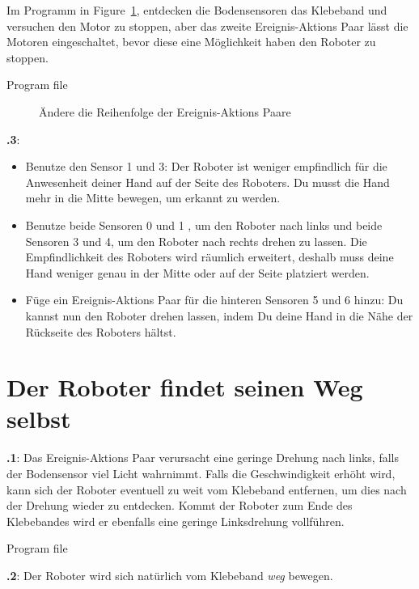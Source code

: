 \documentclass[12pt,a4paper,ngerman]{article}
\begin{document}
Im Programm in Figure~\ref{fig.change}, entdecken die Bodensensoren das Klebeband und versuchen den Motor zu stoppen, aber das zweite Ereignis-Aktions Paar lässt die Motoren eingeschaltet, bevor diese eine Möglichkeit haben den Roboter zu stoppen.

{\raggedleft \hfill Program file }

\begin{figure}[hbt]
\begin{center}
\caption{Ändere die Reihenfolge der Ereignis-Aktions Paare}
\label{fig.change}
\end{center}
\end{figure}

\textbf{\thesection.3}: 
\begin{itemize}
\item Benutze den Sensor 1 und 3: Der Roboter ist weniger empfindlich für die Anwesenheit deiner Hand auf der Seite des Roboters. Du musst die Hand mehr in die Mitte bewegen, um erkannt zu werden.
\item Benutze beide Sensoren 0 und 1 , um den Roboter nach links und beide Sensoren 3 und 4, um den Roboter nach rechts drehen zu lassen. Die Empfindlichkeit des Roboters wird räumlich erweitert, deshalb muss deine Hand weniger genau in der Mitte oder auf der Seite platziert werden.
\item Füge ein Ereignis-Aktions Paar für die hinteren Sensoren 5 und 6 hinzu: Du kannst nun den Roboter drehen lassen, indem Du deine Hand in die Nähe der Rückseite des Roboters hältst.
\end{itemize}


\section{Der Roboter findet seinen Weg selbst}

\textbf{\thesection.1}:
Das Ereignis-Aktions Paar   verursacht eine geringe Drehung nach links, falls der Bodensensor viel Licht wahrnimmt. Falls die Geschwindigkeit erhöht wird, kann sich der Roboter eventuell  zu weit vom Klebeband entfernen, um dies nach der Drehung wieder zu entdecken. Kommt der Roboter zum Ende des Klebebandes wird er ebenfalls eine geringe Linksdrehung vollführen.

{\raggedleft \hfill Program file }

\textbf{\thesection.2}: 
Der Roboter wird sich natürlich vom Klebeband \emph{weg} bewegen.
\end{document}
